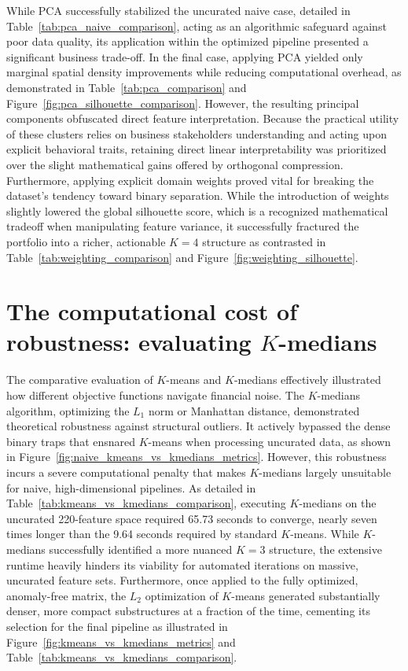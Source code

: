 While PCA successfully stabilized the uncurated naive case, detailed in Table~\ref{tab:pca_naive_comparison}, acting as an algorithmic safeguard against poor data quality, its application within the optimized pipeline presented a significant business trade-off.
In the final case, applying PCA yielded only marginal spatial density improvements while reducing computational overhead, as demonstrated in Table~\ref{tab:pca_comparison} and Figure~\ref{fig:pca_silhouette_comparison}.
However, the resulting principal components obfuscated direct feature interpretation. Because the practical utility of these clusters relies on business stakeholders understanding and acting upon explicit behavioral traits, retaining direct linear interpretability was prioritized over the slight mathematical gains offered by orthogonal compression.
Furthermore, applying explicit domain weights proved vital for breaking the dataset's tendency toward binary separation.
While the introduction of weights slightly lowered the global silhouette score, which is a recognized mathematical tradeoff when manipulating feature variance, it successfully fractured the portfolio into a richer, actionable $K=4$ structure as contrasted in Table~\ref{tab:weighting_comparison} and Figure~\ref{fig:weighting_silhouette}.

\section{The computational cost of robustness: evaluating $K$-medians}

The comparative evaluation of $K$-means and $K$-medians effectively illustrated how different objective functions navigate financial noise.
The $K$-medians algorithm, optimizing the $L_1$ norm or Manhattan distance, demonstrated theoretical robustness against structural outliers.
It actively bypassed the dense binary traps that ensnared $K$-means when processing uncurated data, as shown in Figure~\ref{fig:naive_kmeans_vs_kmedians_metrics}.
However, this robustness incurs a severe computational penalty that makes $K$-medians largely unsuitable for naive, high-dimensional pipelines.
As detailed in Table~\ref{tab:kmeans_vs_kmedians_comparison}, executing $K$-medians on the uncurated 220-feature space required 65.73 seconds to converge, nearly seven times longer than the 9.64 seconds required by standard $K$-means.
While $K$-medians successfully identified a more nuanced $K=3$ structure, the extensive runtime heavily hinders its viability for automated iterations on massive, uncurated feature sets.
Furthermore, once applied to the fully optimized, anomaly-free matrix, the $L_2$ optimization of $K$-means generated substantially denser, more compact substructures at a fraction of the time, cementing its selection for the final pipeline as illustrated in Figure~\ref{fig:kmeans_vs_kmedians_metrics} and Table~\ref{tab:kmeans_vs_kmedians_comparison}.

